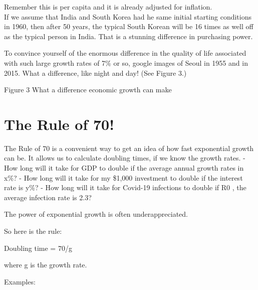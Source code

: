 \documentclass[
]{book}
\begin{document}
Remember this is per capita and it is already adjusted for inflation.\\
If we assume that India and South Korea had he same initial starting conditions in 1960, then after 50 years, the typical South Korean will be 16 times as well off as the typical person in India. That is a stunning difference in purchasing power.

To convince yourself of the enormous difference in the quality of life associated with such large growth rates of 7\% or so, google images of Seoul in 1955 and in 2015. What a difference, like night and day! (See Figure 3.)

Figure 3 What a difference economic growth can make

\hypertarget{the-rule-of-70}{%
\section{The Rule of 70!}\label{the-rule-of-70}}

The Rule of 70 is a convenient way to get an idea of how fast exponential growth can be. It allows us to calculate doubling times, if we know the growth rates.
- How long will it take for GDP to double if the average annual growth rates in x\%?
- How long will it take for my \$1,000 investment to double if the interest rate is y\%?
- How long will it take for Covid-19 infections to double if R0 , the average infection rate is 2.3?

The power of exponential growth is often underappreciated.

So here is the rule:

Doubling time = 70/g

where g is the growth rate.

Examples:
\end{document}
